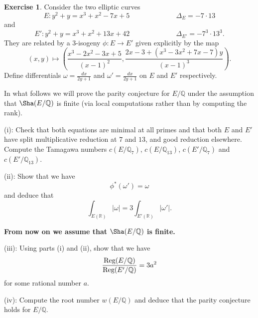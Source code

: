 \documentclass[12pt]{amsart}
\numberwithin{equation}{section}
\theoremstyle{remark}
\theoremstyle{definition}
\theoremstyle{definition}
\theoremstyle{definition}
\theoremstyle{definition}
\theoremstyle{definition}
\theoremstyle{definition}
\newtheorem{exercise}[equation]{Exercise}
\theoremstyle{definition}
\begin{document}
\begin{exercise}
Consider the two elliptic curves
\[E:y^2+y=x^3+x^2-7x+5~~~~~~\phantom{howdoyoudo}\Delta_E=-7\cdot 13\]
and
\[E':y^2+y=x^3+x^2+13x+42~~~~~~\phantom{howdoyoudo}\Delta_{E'}=-7^3\cdot 13^3.\]
They are related by a $3$-isogeny $\phi:E\rightarrow E'$ given explicitly by the map
\[(x,y)\mapsto \left(\frac{x^3-2x^2-3x+5}{(x-1)^2},\frac{2x-3+(x^3-3x^2+7x-7)y}{(x-1)^3}\right).\]
Define differentials $\omega=\frac{dx}{2y+1}$ and $\omega'=\frac{dx}{2y+1}$ on $E$ and $E'$ respectively. 

In what follows we will prove the parity conjecture for $E/\mathbb{Q}$ under the assumption that $\Sha(E/\mathbb{Q})$ is finite (via  local computations rather than by computing the rank). 

(i): Check that both equations are minimal at all primes and that both $E$ and $E'$ have split multiplicative reduction at $7$ and $13$, and good reduction elsewhere. Compute the Tamagawa numbers $c(E/\mathbb{Q}_7)$, $c(E/\mathbb{Q}_{13})$, $c(E'/\mathbb{Q}_7)$ and $c(E'/\mathbb{Q}_{13})$. 



(ii): Show that we have
\[\phi^*(\omega')=\omega\]
and deduce that
\[\int_{E(\mathbb{R})}|\omega|=3\int_{E'(\mathbb{R})}|\omega'|.\]

\bigskip
\textbf{From now on we assume that} $\Sha(E/\mathbb{Q})$ \textbf{is finite.}
\bigskip

(iii): Using parts (i) and (ii), show that we have
\[\frac{\textup{Reg}(E/\mathbb{Q})}{\textup{Reg}(E'/\mathbb{Q})}=3a^2\]
for some rational number $a$. 

(iv): Compute the root number $w(E/\mathbb{Q})$ and deduce that the parity conjecture holds for $E/\mathbb{Q}$. 
\end{exercise}
\end{document}
